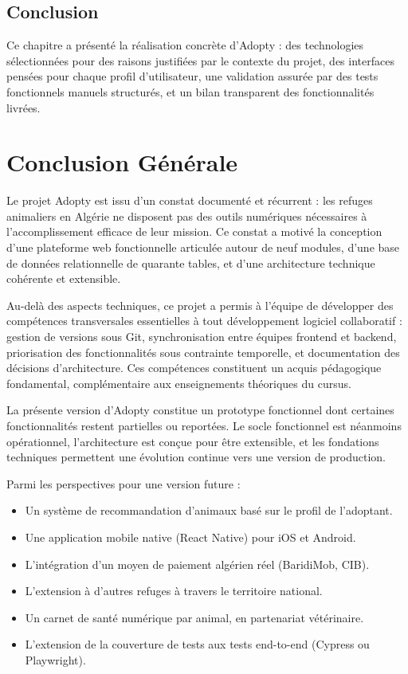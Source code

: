 \documentclass[12pt,a4paper]{report}
\begin{document}
\section{Conclusion}

Ce chapitre a présenté la réalisation concrète d'Adopty : des technologies sélectionnées pour des raisons justifiées par le contexte du projet, des interfaces pensées pour chaque profil d'utilisateur, une validation assurée par des tests fonctionnels manuels structurés, et un bilan transparent des fonctionnalités livrées.

\chapter*{Conclusion Générale}
\thispagestyle{plain}

Le projet Adopty est issu d'un constat documenté et récurrent : les refuges animaliers en Algérie ne disposent pas des outils numériques nécessaires à l'accomplissement efficace de leur mission. Ce constat a motivé la conception d'une plateforme web fonctionnelle articulée autour de neuf modules, d'une base de données relationnelle de quarante tables, et d'une architecture technique cohérente et extensible.

Au-delà des aspects techniques, ce projet a permis à l'équipe de développer des compétences transversales essentielles à tout développement logiciel collaboratif : gestion de versions sous Git, synchronisation entre équipes frontend et backend, priorisation des fonctionnalités sous contrainte temporelle, et documentation des décisions d'architecture. Ces compétences constituent un acquis pédagogique fondamental, complémentaire aux enseignements théoriques du cursus.

La présente version d'Adopty constitue un prototype fonctionnel dont certaines fonctionnalités restent partielles ou reportées. Le socle fonctionnel est néanmoins opérationnel, l'architecture est conçue pour être extensible, et les fondations techniques permettent une évolution continue vers une version de production.

Parmi les perspectives pour une version future :
\begin{itemize}[leftmargin=2em,itemsep=2pt]
  \item Un système de recommandation d'animaux basé sur le profil de l'adoptant.
  \item Une application mobile native (React Native) pour iOS et Android.
  \item L'intégration d'un moyen de paiement algérien réel (BaridiMob, CIB).
  \item L'extension à d'autres refuges à travers le territoire national.
  \item Un carnet de santé numérique par animal, en partenariat vétérinaire.
  \item L'extension de la couverture de tests aux tests end-to-end (Cypress ou Playwright).
\end{itemize}
\end{document}
